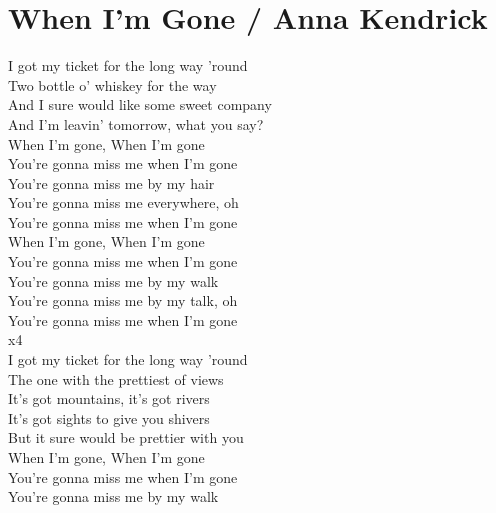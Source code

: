 \section{When I'm Gone / Anna Kendrick}\label{sec:whatsup}

\Cmajor
\Fmajor
\Aminor
\Gmajor

  

I got my ticket for the long way 'round\\
Two bottle o' whiskey for the way\\
And I sure would like some sweet company\\
And I'm leavin' tomorrow, what you say?\\
When I'm gone, When I'm gone\\
You're gonna miss me when I'm gone\\
You're gonna miss me by my hair\\
You're gonna miss me everywhere, oh\\
You're gonna miss me when I'm gone\\
When I'm gone, When I'm gone\\
You're gonna miss me when I'm gone\\
You're gonna miss me by my walk\\
You're gonna miss me by my talk, oh\\
You're gonna miss me when I'm gone\\
 x4\\
I got my ticket for the long way 'round\\
The one with the prettiest of views\\
It's got mountains, it's got rivers\\
It's got sights to give you shivers\\
But it sure would be prettier with you\\
When I'm gone, When I'm gone\\
You're gonna miss me when I'm gone\\
You're gonna miss me by my walk\\
